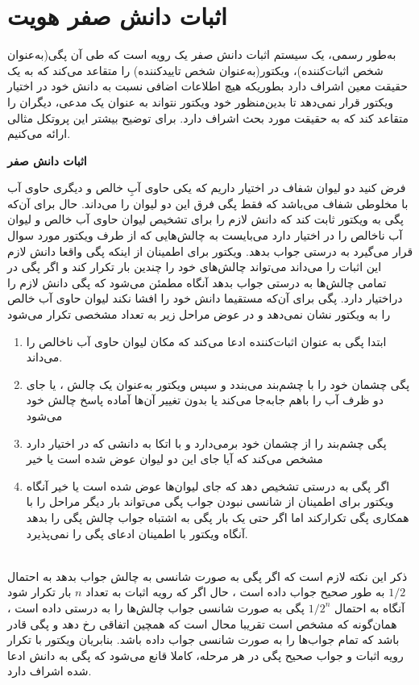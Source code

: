 \section{اثبات دانش صفر هویت}\label{ZKPOI}

به‌طور رسمی، یک سیستم اثبات دانش صفر یک رویه است که طی آن پگی(به‌عنوان شخص اثبات‌کننده)، ویکتور(به‌عنوان شخص تاییدکننده) را متقاعد می‌کند که به یک حقیقت معین  
اشراف دارد بطوریکه هیچ اطلاعات اضافی نسبت به دانش خود در اختیار ویکتور قرار نمی‌دهد تا بدین‌منظور خود ویکتور نتواند به عنوان یک مدعی، دیگران را متقاعد کند که به حقیقت مورد بحث اشراف دارد. برای توضیح بیشتر این پروتکل مثالی ارائه می‌کنیم.
\begin{example}\label{ex_zkp}\textbf{اثبات دانش صفر}
	
فرض کنید دو لیوان شفاف در اختیار داریم که یکی حاوی آبِ خالص و دیگری حاوی آب با مخلوطی شفاف می‌باشد که فقط پگی فرق این دو لیوان را می‌داند. حال برای آن‌که پگی به ویکتور ثابت کند که دانش لازم را برای تشخیص لیوان حاوی آب خالص و لیوان آب ناخالص را در اختیار دارد می‌بایست به چالش‌هایی که از طرف ویکتور مورد سوال قرار می‌گیرد به درستی جواب بدهد. ویکتور برای اطمینان از اینکه پگی واقعا دانش لازم این اثبات را می‌داند می‌تواند چالش‌های خود را چندین بار تکرار کند و اگر پگی در تمامی چالش‌ها به درستی جواب بدهد آنگاه مطمئن می‌شود که پگی دانش لازم را دراختیار دارد. پگی برای آن‌که مستقیما دانش خود را افشا نکند لیوان حاوی آب خالص را به ویکتور نشان نمی‌دهد و در عوض مراحل زیر به تعداد مشخصی تکرار می‌شود
\begin{enumerate}
	\item 
	ابتدا پگی به عنوان اثبات‌کننده ادعا می‌کند که مکان لیوان‌ حاوی آب ناخالص  را می‌داند.
	\item 
 پگی چشمان خود را با چشم‌بند می‌بندد و سپس	ویکتور به‌عنوان یک  چالش ، یا جای دو ظرف آب را باهم جا‌به‌جا می‌کند یا بدون تغییر آن‌ها آماده پاسخ چالش خود می‌شود
	\item 
	پگی چشم‌بند را از چشمان خود برمی‌دارد و با اتکا به دانشی که در اختیار دارد مشخص می‌کند که آیا جای این دو لیوان عوض شده است یا خیر
	\item 
	اگر پگی به درستی تشخیص دهد که جای لیوان‌ها عوض شده است یا خیر  آنگاه ویکتور برای اطمینان از شانسی نبودن جواب پگی می‌تواند بار دیگر مراحل را با همکاری پگی تکرارکند اما اگر حتی یک بار پگی به اشتباه جواب چالش پگی را بدهد آنگاه ویکتور با اطمینان ادعای پگی را نمی‌پذیرد.
\end{enumerate}~
\\
ذکر این نکته لازم است که اگر پگی به صورت شانسی به چالش جواب بدهد به احتمال
$1/2$
به طور صحیح  جواب داده است ، حال اگر  که رویه اثبات به تعداد 
$n$
بار تکرار شود آنگاه به احتمال 
$1 / 2^n$
 پگی به صورت شانسی جواب چالش‌ها را  به درستی داده است ، همان‌گونه که مشخص است تقریبا محال است که همچین اتفاقی رخ دهد و پگی قادر باشد که تمام جواب‌ها را به صورت شانسی جواب داده باشد. بنابریان ویکتور با تکرار رویه اثبات و جواب صحیح پگی در هر مرحله، کاملا قانع می‌شود که پگی به دانش ادعا شده اشراف دارد.

\end{example}~
